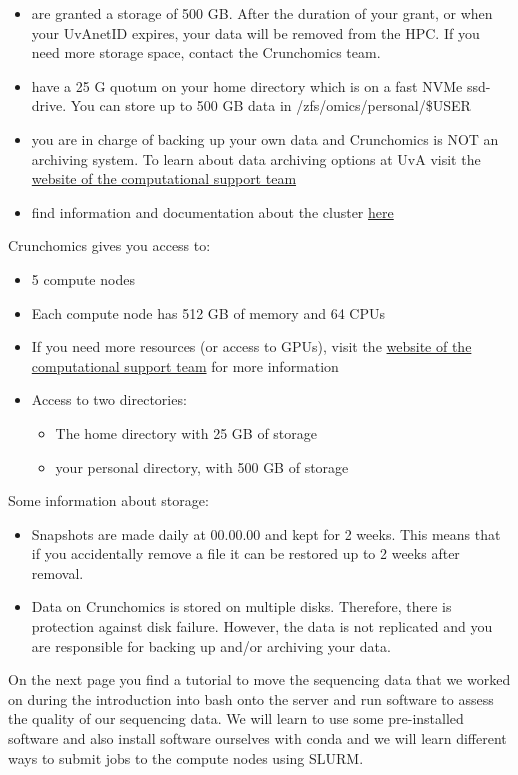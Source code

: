 \documentclass[
  letterpaper,
  DIV=11,
  numbers=noendperiod]{scrreprt}
\providecommand{\tightlist}{%
  \setlength{\itemsep}{0pt}\setlength{\parskip}{0pt}}\usepackage{longtable,booktabs,array}
\begin{document}
\begin{itemize}
\tightlist
\item
  are granted a storage of 500 GB. After the duration of your grant, or
  when your UvAnetID expires, your data will be removed from the HPC. If
  you need more storage space, contact the Crunchomics team.
\item
  have a 25 G quotum on your home directory which is on a fast NVMe
  ssd-drive. You can store up to 500 GB data in
  /zfs/omics/personal/\$USER
\item
  you are in charge of backing up your own data and Crunchomics is NOT
  an archiving system. To learn about data archiving options at UvA
  visit the
  \href{https://ibed.uva.nl/facilities/computational-facilities/ibed-computational-support-team/ibed-computational-support-team.html}{website
  of the computational support team}
\item
  find information and documentation about the cluster
  \href{https://crunchomics-documentation.readthedocs.io/en/latest}{here}
\end{itemize}

Crunchomics gives you access to:

\begin{itemize}
\tightlist
\item
  5 compute nodes
\item
  Each compute node has 512 GB of memory and 64 CPUs
\item
  If you need more resources (or access to GPUs), visit the
  \href{https://ibed.uva.nl/facilities/computational-facilities/ibed-computational-support-team/ibed-computational-support-team.html}{website
  of the computational support team} for more information
\item
  Access to two directories:

  \begin{itemize}
  \tightlist
  \item
    The home directory with 25 GB of storage
  \item
    your personal directory, with 500 GB of storage
  \end{itemize}
\end{itemize}

Some information about storage:

\begin{itemize}
\tightlist
\item
  Snapshots are made daily at 00.00.00 and kept for 2 weeks. This means
  that if you accidentally remove a file it can be restored up to 2
  weeks after removal.
\item
  Data on Crunchomics is stored on multiple disks. Therefore, there is
  protection against disk failure. However, the data is not replicated
  and you are responsible for backing up and/or archiving your data.
\end{itemize}

On the next page you find a tutorial to move the sequencing data that we
worked on during the introduction into bash onto the server and run
software to assess the quality of our sequencing data. We will learn to
use some pre-installed software and also install software ourselves with
conda and we will learn different ways to submit jobs to the compute
nodes using SLURM.
\end{document}
